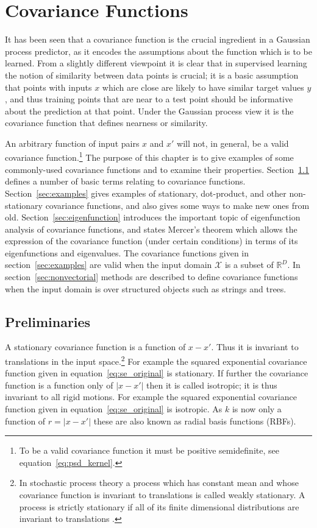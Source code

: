 \documentclass[11pt]{book}
\begin{document}
\chapter{Covariance Functions}
\label{ch:covariance}

It has been seen that a covariance function is the crucial ingredient in a Gaussian process predictor, as it encodes the assumptions about the function which is to be learned. From a slightly different viewpoint it is clear that in supervised learning the notion of similarity between data points is crucial; it is a basic assumption that points with inputs $x$ which are close are likely to have similar target values $y$, and thus training points that are near to a test point should be informative about the prediction at that point. Under the Gaussian process view it is the covariance function that defines nearness or similarity.

An arbitrary function of input pairs $x$ and $x'$ will not, in general, be a valid covariance function.\footnote{To be a valid covariance function it must be positive semidefinite, see equation~\eqref{eq:psd_kernel}.} The purpose of this chapter is to give examples of some commonly-used covariance functions and to examine their properties. Section~\ref{sec:preliminaries} defines a number of basic terms relating to covariance functions. Section~\ref{sec:examples} gives examples of stationary, dot-product, and other non-stationary covariance functions, and also gives some ways to make new ones from old. Section~\ref{sec:eigenfunction} introduces the important topic of eigenfunction analysis of covariance functions, and states Mercer's theorem which allows the expression of the covariance function (under certain conditions) in terms of its eigenfunctions and eigenvalues. The covariance functions given in section~\ref{sec:examples} are valid when the input domain $\mathcal{X}$ is a subset of $\mathbb{R}^D$. In section~\ref{sec:nonvectorial} methods are described to define covariance functions when the input domain is over structured objects such as strings and trees.

\section{Preliminaries}
\label{sec:preliminaries}

A stationary covariance function is a function of $x - x'$. Thus it is invariant to translations in the input space.\footnote{In stochastic process theory a process which has constant mean and whose covariance function is invariant to translations is called weakly stationary. A process is strictly stationary if all of its finite dimensional distributions are invariant to translations \cite{papoulis1991}.} For example the squared exponential covariance function given in equation~\eqref{eq:se_original} is stationary. If further the covariance function is a function only of $|x - x'|$ then it is called isotropic; it is thus invariant to all rigid motions. For example the squared exponential covariance function given in equation~\eqref{eq:se_original} is isotropic. As $k$ is now only a function of $r = |x - x'|$ these are also known as radial basis functions (RBFs).
\end{document}
